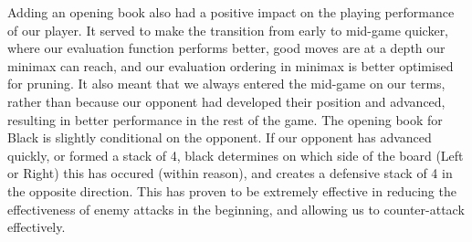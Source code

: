 \documentclass[11pt]{article}
\newcommand{\drafting}[1]{\textcolor{OliveGreen}{#1}}
\begin{document}
Adding an opening book also had a positive impact on the playing performance of our player. It served to make the transition from early to mid-game quicker, where our evaluation function performs better, good moves are at a depth our minimax can reach, and our evaluation ordering in minimax is better optimised for pruning. It also meant that we always entered the mid-game on our terms, rather than because our opponent had developed their position and advanced, resulting in better performance in the rest of the game. \drafting{The opening book for Black is slightly conditional on the opponent. If our opponent has advanced quickly, or formed a stack of 4, black determines on which side of the board (Left or Right) this has occured (within reason), and creates a defensive stack of 4 in the opposite direction. This has proven to be extremely effective in reducing the effectiveness of enemy attacks in the beginning, and allowing us to counter-attack effectively.}

\pagebreak
\printbibliography
\end{document}
